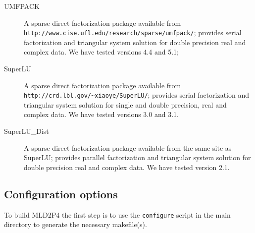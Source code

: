 \begin{description}
\item[UMFPACK] \cite{UMFPACK}
  A sparse direct factorization package available from \\ 
  \verb|http://www.cise.ufl.edu/research/sparse/umfpack/|; 
  provides serial factorization and triangular system solution for double
  precision real and complex data. We have tested
  versions 4.4 and 5.1; 
\item[SuperLU] \cite{SUPERLU}
  A sparse direct factorization package available from \\
  \verb|http://crd.lbl.gov/~xiaoye/SuperLU/|; provides serial
  factorization and triangular system solution for single and double precision,
  real and complex data. We have tested versions 3.0 and 3.1.
\item[SuperLU\_Dist] \cite{SUPERLUDIST}
  A sparse direct factorization package available
  from the same site as SuperLU; provides parallel factorization and
  triangular system solution for double precision real and complex data.
  We have tested version 2.1.
\end{description}

\subsection{Configuration options}

To build  MLD2P4 the first step is to use the \verb|configure| script
in the main directory to generate the necessary makefile(s). 

